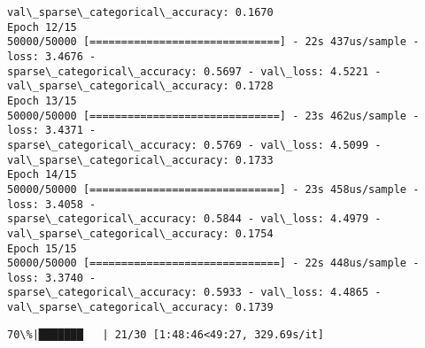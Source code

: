 \documentclass[11pt]{article}
\begin{document}
\begin{Verbatim}[commandchars=\\\{\}]
val\_sparse\_categorical\_accuracy: 0.1670
Epoch 12/15
50000/50000 [==============================] - 22s 437us/sample - loss: 3.4676 -
sparse\_categorical\_accuracy: 0.5697 - val\_loss: 4.5221 -
val\_sparse\_categorical\_accuracy: 0.1728
Epoch 13/15
50000/50000 [==============================] - 23s 462us/sample - loss: 3.4371 -
sparse\_categorical\_accuracy: 0.5769 - val\_loss: 4.5099 -
val\_sparse\_categorical\_accuracy: 0.1733
Epoch 14/15
50000/50000 [==============================] - 23s 458us/sample - loss: 3.4058 -
sparse\_categorical\_accuracy: 0.5844 - val\_loss: 4.4979 -
val\_sparse\_categorical\_accuracy: 0.1754
Epoch 15/15
50000/50000 [==============================] - 22s 448us/sample - loss: 3.3740 -
sparse\_categorical\_accuracy: 0.5933 - val\_loss: 4.4865 -
val\_sparse\_categorical\_accuracy: 0.1739
    \end{Verbatim}

    \begin{Verbatim}[commandchars=\\\{\}]
 70\%|███████   | 21/30 [1:48:46<49:27, 329.69s/it]
    \end{Verbatim}
\end{document}
